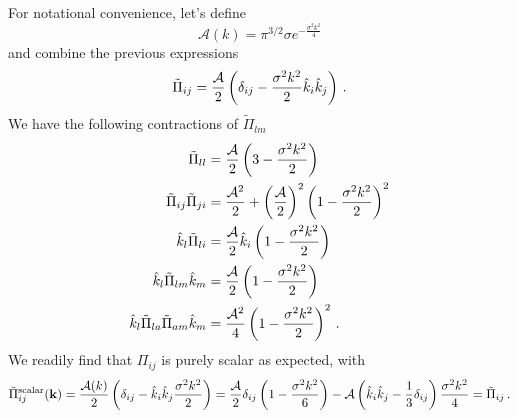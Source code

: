 \documentclass{revtex4}
\begin{document}
For notational convenience, let's define
\begin{equation}
  \mathcal{A}(k) = \pi^{3/2}\sigma e^{-\frac{\sigma^2k^2}{4}}
\end{equation}
and combine the previous expressions
\begin{equation}
  \tilde{\Pi}_{ij} = \frac{\mathcal{A}}{2}\left(\delta_{ij} - \frac{\sigma^2k^2}{2}\hat{k}_i\hat{k}_j\right) \, .
\end{equation}
We have the following contractions of $\tilde{\Pi}_{lm}$
\begin{subequations}
\begin{align}
  \tilde{\Pi}_{ll} &= \frac{\mathcal{A}}{2}\left(3-\frac{\sigma^2k^2}{2}\right) \\
  \tilde{\Pi}_{ij}\tilde{\Pi}_{ji} &= \frac{\mathcal{A}^2}{2} + \left(\frac{\mathcal{A}}{2}\right)^2\left(1-\frac{\sigma^2k^2}{2}\right)^2 \\
  \hat{k}_l\tilde{\Pi}_{li} &= \frac{\mathcal{A}}{2}\hat{k}_i\left(1-\frac{\sigma^2k^2}{2}\right) \\
  \hat{k}_l\tilde{\Pi}_{lm}\hat{k}_m &= \frac{\mathcal{A}}{2}\left(1-\frac{\sigma^2k^2}{2}\right) \\
  \hat{k}_l\tilde{\Pi}_{la}\tilde{\Pi}_{am}\hat{k}_m &= \frac{\mathcal{A}^2}{4}\left(1-\frac{\sigma^2k^2}{2}\right)^2 \, .
\end{align}
\end{subequations}
We readily find that $\Pi_{ij}$ is purely scalar as expected, with
\begin{equation}
  \tilde{\Pi}_{ij}^{{\rm scalar}}({\bf k})
  = \frac{\mathcal{A}(k)}{2}\left(\delta_{ij}-\hat{k}_i\hat{k}_j\frac{\sigma^2k^2}{2}\right)
  = \frac{\mathcal{A}}{2}\delta_{ij}\left(1-\frac{\sigma^2k^2}{6}\right) - \mathcal{A}\left(\hat{k}_i\hat{k}_j-\frac{1}{3}\delta_{ij}\right)\frac{\sigma^2 k^2}{4}
  = \tilde{\Pi}_{ij} \, .
\end{equation}
\end{document}
